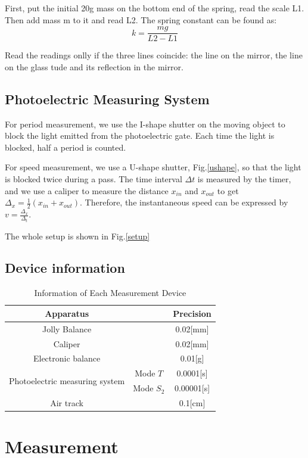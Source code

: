 \documentclass[12pt,a4paper]{article}
\begin{document}
First, put the initial 20g mass on the bottom end of the spring, read the scale L1. Then add mass m to it and read L2. The spring constant can be found as:
$$k=\frac{mg}{L2-L1}$$\par
Read the readings onlly if the three lines coincide: the line on the mirror, the line on the glass tude and its reflection in the mirror.

\subsection{Photoelectric Measuring System}
For period measurement, we use the I-shape shutter on the moving object to block the light emitted from the photoelectric gate. Each time the light is blocked, half a period is counted.\par 
For speed measurement, we use a U-shape shutter, Fig.\ref{ushape}, so that the light is blocked twice during a pass. The time interval $\Delta t$ is measured by the timer, and we use a caliper to measure the distance $x_{in}$ and $x_{out}$  to get $\Delta_x=\frac{1}{2}(x_{in}+x_{out})$. Therefore, the instantaneous speed can be expressed by $v=\frac{\Delta_x}{\Delta_t}$.\par 

The whole setup is shown in Fig.\ref{setup}

\subsection{Device information}

\begin{table}[H]
    \centering
    \begin{tabular}{ccc}
        \hline
    Apparatus & & Precision \\\hline  
    Jolly Balance & & 0.02[mm] \\ 
    Caliper & & 0.02[mm]  \\
    Electronic balance & & 0.01[g] \\
    \multirow{2}{*}{Photoelectric measuring system} & Mode $T$   & 0.0001[s]       \\
    & Mode $S_2$ & 0.00001[s]     \\
    Air track & & 0.1[cm]       \\\hline
    \end{tabular}
    \caption{Information of Each Measurement Device}
\end{table}

\section{Measurement}
\end{document}
